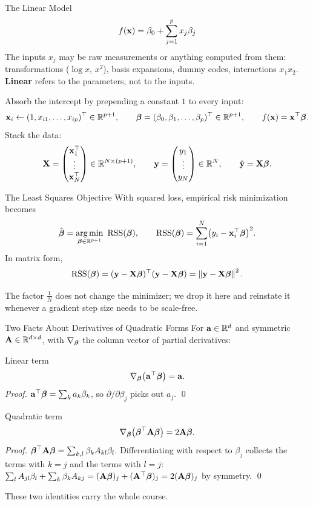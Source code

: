 \documentclass[11pt,aspectratio=169]{beamer}
\begin{document}
\begin{frame}{The Linear Model}
\[
f(\mathbf{x})=\beta_0+\sum_{j=1}^p x_j\beta_j
\]
The inputs $x_j$ may be raw measurements or anything computed from them:
transformations ($\log x$, $x^2$), basis expansions, dummy codes, interactions $x_1x_2$.
\textbf{Linear} refers to the parameters, not to the inputs.

\vspace{6pt}
Absorb the intercept by prepending a constant $1$ to every input:
\[
\mathbf{x}_i\leftarrow(1,x_{i1},\dots,x_{ip})^{\top}\in\mathbb{R}^{p+1},\qquad
\boldsymbol{\beta}=(\beta_0,\beta_1,\dots,\beta_p)^{\top}\in\mathbb{R}^{p+1},\qquad
f(\mathbf{x})=\mathbf{x}^{\top}\boldsymbol{\beta} .
\]
Stack the data:
\[
\mathbf{X}=\begin{pmatrix}\mathbf{x}_1^{\top}\\ \vdots\\ \mathbf{x}_N^{\top}\end{pmatrix}\in\mathbb{R}^{N\times(p+1)},\qquad
\mathbf{y}=\begin{pmatrix}y_1\\ \vdots\\ y_N\end{pmatrix}\in\mathbb{R}^N,\qquad
\hat{\mathbf{y}}=\mathbf{X}\boldsymbol{\beta} .
\]
\end{frame}

\begin{frame}{The Least Squares Objective}
With squared loss, empirical risk minimization becomes
\[
\hat\vbeta=\argmin_{\vbeta\in\R^{p+1}}\ \RSS(\vbeta),\qquad
\RSS(\vbeta)=\sum_{i=1}^N\bigl(y_i-\vx_i\T\vbeta\bigr)^2 .
\]
In matrix form,
\[
\operatorname{RSS}(\boldsymbol{\beta})=(\mathbf{y}-\mathbf{X}\boldsymbol{\beta})^{\top}(\mathbf{y}-\mathbf{X}\boldsymbol{\beta})=\left\lVert \mathbf{y}-\mathbf{X}\boldsymbol{\beta} \right\rVert^2 .
\]
\begin{keypoint}
The factor $\tfrac1N$ does not change the minimizer; we drop it here and reinstate it whenever a
gradient step size needs to be scale-free.
\end{keypoint}
\end{frame}

\begin{frame}{Two Facts About Derivatives of Quadratic Forms}
For $\mathbf{a}\in\mathbb{R}^d$ and symmetric $\mathbf{A}\in\mathbb{R}^{d\times d}$, with $\nabla_{\boldsymbol{\beta}}$ the column vector of partial derivatives:
\begin{derivation}{Linear term}
\[
\nabla_{\boldsymbol{\beta}}\bigl(\mathbf{a}^{\top}\boldsymbol{\beta}\bigr)=\mathbf{a} .
\]
\emph{Proof.} $\mathbf{a}^{\top}\boldsymbol{\beta}=\sum_k a_k\beta_k$, so $\partial/\partial\beta_j$ picks out $a_j$. \qed
\end{derivation}
\begin{derivation}{Quadratic term}
\[
\nabla_{\boldsymbol{\beta}}\bigl(\boldsymbol{\beta}^{\top}\mathbf{A}\boldsymbol{\beta}\bigr)=2\mathbf{A}\boldsymbol{\beta} .
\]
\emph{Proof.} $\boldsymbol{\beta}^{\top}\mathbf{A}\boldsymbol{\beta}=\sum_{k,l}\beta_kA_{kl}\beta_l$. Differentiating with respect to $\beta_j$
collects the terms with $k=j$ and the terms with $l=j$:
$\sum_l A_{jl}\beta_l+\sum_k\beta_kA_{kj}=(\mathbf{A}\boldsymbol{\beta})_j+(\mathbf{A}^{\top}\boldsymbol{\beta})_j=2(\mathbf{A}\boldsymbol{\beta})_j$ by symmetry. \qed
\end{derivation}
These two identities carry the whole course.
\end{frame}
\end{document}
